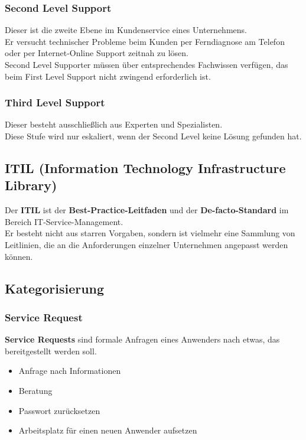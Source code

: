 \documentclass[10pt]{article}
\begin{document}
\subsubsection{Second Level Support}

Dieser ist die zweite Ebene im Kundenservice eines Unternehmens. \\
Er versucht technischer Probleme beim Kunden per Ferndiagnose am Telefon oder per Internet-Online Support zeitnah zu lösen. \\
Second Level Supporter müssen über entsprechendes Fachwissen verfügen, das beim First Level Support nicht zwingend erforderlich ist.


\subsubsection{Third Level Support}

Dieser besteht ausschließlich aus Experten und Spezialisten. \\ 
Diese Stufe wird nur eskaliert, wenn der Second Level keine Lösung gefunden hat.


\subsection{ITIL  (Information Technology Infrastructure Library)}

Der \textbf{ITIL}  ist der \textbf{Best-Practice-Leitfaden} und der \textbf{De-facto-Standard} im Bereich IT-Service-Management. \\
Er besteht nicht aus starren Vorgaben, sondern ist vielmehr eine Sammlung von Leitlinien, die an die Anforderungen einzelner Unternehmen angepasst werden können.
\subsection{Kategorisierung}
\subsubsection{Service Request}

\textbf{Service Requests} sind formale Anfragen eines Anwenders nach etwas, das bereitgestellt werden soll. \\
\begin{itemize}
\item Anfrage nach Informationen
\item Beratung 
\item Passwort zurücksetzen
\item Arbeitsplatz für einen neuen Anwender aufsetzen
\end{itemize}
\end{document}
